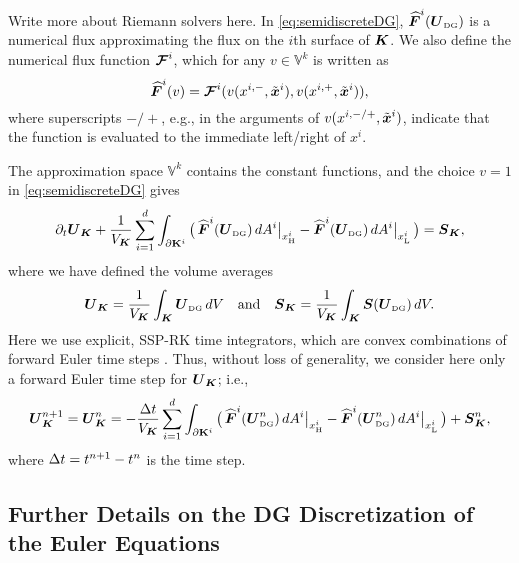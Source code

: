 \documentclass[10pt,preprint]{aastex}
\newcommand{\ee}[1]{{\color{red} #1}}
\newcommand{\pbK}{\partial\mathbf{K}}
\newcommand{\UDG}{\bU_{\mbox{\tiny DG}}}
\newcommand{\sumx}{\sum_{i=1}^{d}}
\begin{document}
\ee{Write more about Riemann solvers here.}
In \eqref{eq:semidiscreteDG}, $\vect{\widehat{F}}^{i}(\UDG)$ is a numerical flux approximating the flux on the $i$th surface of $\boldsymbol{K}$.  
We also define the numerical flux function $\boldsymbol{\mathcal{F}}^{i}$, which for any $v\in\mathbb{V}^{k}$ is written as
\begin{equation}
  \boldsymbol{\widehat{F}}^{i}(v)=\boldsymbol{\mathcal{F}}^{i}(v(x^{i,-},\tilde{\boldsymbol{x}}^{i}),v(x^{i,+},\tilde{\boldsymbol{x}}^{i})),
\end{equation}
where superscripts $-/+$, e.g., in the arguments of $v(x^{i,-/+},\tilde{\boldsymbol{x}}^{i})$, indicate that the function is evaluated to the immediate left/right of $x^{i}$.  

The approximation space $\mathbb{V}^{k}$ contains the constant functions, and the choice $v=1$ in \eqref{eq:semidiscreteDG} gives
\begin{equation}
  \partial_{t}\bU_{\bK}
  +\f{1}{V_{\bK}}\sumx\int_{\pbK^{i}}\big(\,\widehat{\vect{F}}^{i}(\UDG)\,dA^{i}\big|_{\xH^{i}}-\widehat{\vect{F}}^{i}(\UDG)\,dA^{i}\big|_{\xL^{i}}\,\big)
  =\bS_{\bK},
\end{equation}
where we have defined the volume averages
\begin{equation}
  \bU_{\bK}=\f{1}{V_{\bK}}\int_{\bK}\UDG\,dV \quad\text{and}\quad
  \bS_{\bK}=\f{1}{V_{\bK}}\int_{\bK}\vect{S}(\UDG)\,dV.  
\end{equation}
Here we use explicit, SSP-RK time integrators, which are convex combinations of forward Euler time steps \citep{gottlieb_etal_2001}.  
Thus, without loss of generality, we consider here only a forward Euler time step for $\boldsymbol{U}_{\boldsymbol{K}}$; i.e., 
\begin{equation}
  \bU_{\bK}^{n+1}=\bU_{\bK}^{n}
  =-\f{\dt}{V_{\bK}}\sumx\int_{\pbK^{i}}\big(\,\widehat{\vect{F}}^{i}(\UDG^{n})\,dA^{i}\big|_{\xH^{i}}-\widehat{\vect{F}}^{i}(\UDG^{n})\,dA^{i}\big|_{\xL^{i}}\,\big)
  +\vect{S}_{\bK}^{n},
\end{equation}
where $\Delta t=t^{n+1}-t^{n}$ is the time step.  

\subsection{Further Details on the DG Discretization of the Euler Equations}
\end{document}
